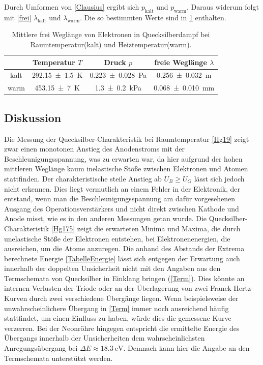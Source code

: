 \documentclass[
	a4paper,
	12pt,
	pagesize,
	ngerman
]{scrartcl}
\begin{document}
	Durch Umformen von \cref{Clausius} ergibt sich $p_\text{kalt}$ und $p_\text{warm}$.
	Daraus widerum folgt mit \cref{frei} $\lambda_\text{kalt}$ und $\lambda_\text{warm}$.
	Die so bestimmten Werte sind in \cref{TabelleFrei} enthalten.
	
	\begin{table}[H]
		\centering
		\begin{tabular}{ c | c | c | c }
			&Temperatur $T$ & Druck $p$ &  freie Weglänge $\lambda$ \\ \hline
			kalt&\SI{292.15 +- 1,5}{K} &\SI{0,223+-0,028}{Pa} &  \SI{0,256+- 0,032}{m} \\
			warm&\SI{453.15+- 7}{K} & \SI{1,3+-0,2}{kPa} & \SI{0,068 +- 0,010}{mm} \\
		\end{tabular}
		\caption{Mittlere frei Weglänge von Elektronen in Quecksilberdampf bei Raumtemperatur(kalt) und Heiztemperatur(warm).}
		\label{TabelleFrei} 
	\end{table}
	
	
	
	\subsection{Diskussion}
	Die Messung der Quecksilber-Charakteristik bei Raumtemperatur \cref{Hg19} zeigt zwar einen monotonen Anstieg des Anodenstroms mit der Beschleunigungsspannung, was zu erwarten war, da hier aufgrund der hohen mittleren Weglänge kaum inelastische Stöße zwischen Elektronen und Atomen stattfinden. %
	Der charakteristische steile Anstieg ab $U_B \geq U_G$ lässt sich jedoch nicht erkennen.
	Dies liegt vermutlich an einem Fehler in der Elektronik, der entstand, wenn man die Beschleunigungsspannung am dafür vorgesehenen Ausgang des Operationsverstärkers und nicht direkt zwischen Kathode und Anode misst, wie es in den anderen Messungen getan wurde.
	\newline
	Die Quecksilber-Charakteristik \cref{Hg175} zeigt die erwarteten Minima und Maxima, die durch unelastische Stöße der Elektronen entstehen, bei Elektronenenergien, die ausreichen, um die Atome anzuregen.
	Die anhand des Abstands der Extrema berechnete Energie \cref{TabelleEnergie} lässt sich entgegen der Erwartung auch innerhalb der doppelten Unsicherheit nicht mit den Angaben aus den Termschemata von Quecksilber in Einklang bringen (\cref{Term}).
	Dies könnte an internen Verlusten der Triode oder an der Überlagerung von zwei Franck-Hertz-Kurven durch zwei verschiedene Übergänge liegen.
	Wenn beispielsweise der unwahrscheinlichere Übergang in \cref{Term} immer noch ausreichend häufig stattfindet, um einen Einfluss zu haben, würde dies die gemessene Kurve verzerren.
	\newline
	Bei der Neonröhre hingegen entspricht die ermittelte Energie des Übergangs innerhalb der Unsicherheiten dem wahrscheinlichsten Anregungsübergang bei $ \Delta E \approx \SI{18,3}{\electronvolt}$.
	Demnach kann hier die Angabe an den Termschemata unterstützt werden.
	
\end{document}
